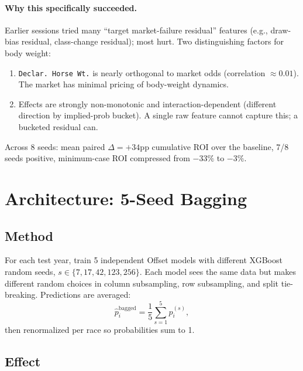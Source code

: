 \documentclass[11pt]{article}
\begin{document}
\paragraph{Why this specifically succeeded.} Earlier sessions tried many
``target market-failure residual'' features (e.g., draw-bias residual,
class-change residual); most hurt. Two distinguishing factors for body
weight:
\begin{enumerate}\item \texttt{Declar.\ Horse\ Wt.} is nearly orthogonal to market
      odds (correlation $\approx 0.01$). The market has minimal
      pricing of body-weight dynamics.
\item Effects are strongly non-monotonic and interaction-dependent
      (different direction by implied-prob bucket). A single raw
      feature cannot capture this; a bucketed residual can.
\end{enumerate}

Across 8 seeds: mean paired $\Delta = +34$pp cumulative ROI over the
baseline, 7/8 seeds positive, minimum-case ROI compressed from
$-33\%$ to $-3\%$.

\section{Architecture: 5-Seed Bagging}

\subsection{Method}

For each test year, train 5 independent Offset models with different
XGBoost random seeds, $s \in \{7, 17, 42, 123, 256\}$. Each model sees the
same data but makes different random choices in column subsampling,
row subsampling, and split tie-breaking. Predictions are averaged:
\[
\hat p_i^{\text{bagged}} = \frac{1}{5} \sum_{s=1}^{5} \hat p_i^{(s)},
\]
then renormalized per race so probabilities sum to 1.

\subsection{Effect}
\end{document}
